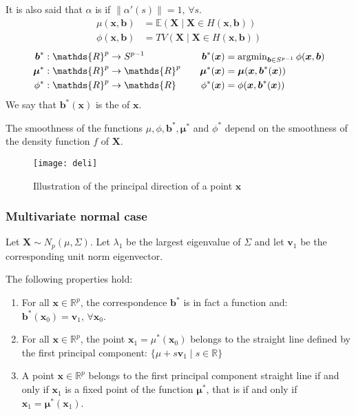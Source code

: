 It is also said that $\alpha$ is  if $\lVert \alpha'(s) \rVert = 1,\,\forall s$.
\begin{align*}
	\mu(\boldsymbol x, \boldsymbol b)  & = \mathds{E}(\boldsymbol X \mid \boldsymbol X \in H(\boldsymbol x, \boldsymbol b)) \\
	\phi(\boldsymbol x, \boldsymbol b) & = TV(\boldsymbol X \mid \boldsymbol X \in H(\boldsymbol x, \boldsymbol b))
\end{align*}
\begin{alignat*}{2}
	\boldsymbol b^*   & : \mathds{R}^p \to S^{p-1}      & \quad \boldsymbol b^*(\boldsymbol x)   & = \argmin_{\boldsymbol b \in S^{p-1}} \phi(\boldsymbol x, \boldsymbol b) \\
	\boldsymbol \mu^* & : \mathds{R}^p \to \mathds{R}^p & \quad \boldsymbol \mu^*(\boldsymbol x) & = \boldsymbol \mu(\boldsymbol x, \boldsymbol b^*(\boldsymbol x))         \\
	\phi^*            & : \mathds{R}^p \to \mathds{R}   & \quad \phi^*(\boldsymbol x)            & = \phi(\boldsymbol x, \boldsymbol b^*(\boldsymbol x))
\end{alignat*}
We say that $\boldsymbol b^*(\boldsymbol x)$ is the  of $\boldsymbol x$.

The smoothness of the functions $\mu, \phi, \boldsymbol b^*, \boldsymbol \mu^*$ and $\phi^*$ depend
on the smoothness of the density function $f$ of $\boldsymbol X$.

\begin{figure}[H]
	\texttt{[image: deli]}
	\caption{Illustration of the principal direction of a point $\boldsymbol x$}
\end{figure}

\subsubsection{Multivariate normal case}
\begin{prop}{}{}
	Let $\boldsymbol X \sim N_p(\mu, \Sigma)$. Let $\lambda_1$ be the largest eigenvalue of $\Sigma$
	and let $\boldsymbol v_1$ be the corresponding unit norm eigenvector.

	The following properties hold:
	\begin{enumerate}
		\item For all $\boldsymbol x \in \mathds{R}^p$, the correspondence $\boldsymbol b^*$ is in
		      fact a function and: $\boldsymbol b^*(\boldsymbol x_0) = \boldsymbol v_1,\,\forall\boldsymbol x_0$.
		\item For all $\boldsymbol x \in \mathds{R}^p$, the point $\boldsymbol x_1 = \mu^*(\boldsymbol x_0)$
		      belongs to the straight line defined by the first principal component:
		      $\{\mu + s\boldsymbol v_1 \mid s \in \mathds R\}$
		\item A point $\boldsymbol x \in \mathds{R}^p$ belongs to the first principal component
		      straight line if and only if $\boldsymbol x_1$ is a fixed point of the function
		      $\boldsymbol \mu^*$, that is if and only if $\boldsymbol x_1 = \boldsymbol \mu^*(\boldsymbol x_1)$.
	\end{enumerate}
\end{prop}

